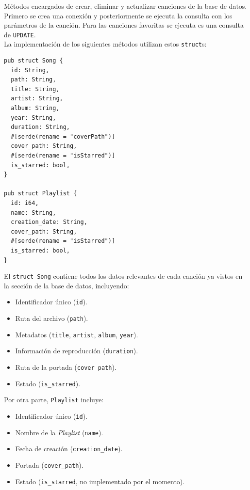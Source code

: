\documentclass[11pt, a4paper]{article}
\begin{document}
            Métodos encargados de crear, eliminar y actualizar canciones de la base de datos. Primero se crea una conexión y posteriormente se ejecuta la consulta con los parámetros de la canción. Para las canciones favoritas se ejecuta es una consulta de \texttt{UPDATE}. \\

            La implementación de los siguientes métodos utilizan estos \texttt{struct}s:

            \begin{lstlisting}[caption={structs Song y Playlist}]
pub struct Song {
  id: String,
  path: String,
  title: String,
  artist: String,
  album: String,
  year: String,
  duration: String,
  #[serde(rename = "coverPath")]
  cover_path: String,
  #[serde(rename = "isStarred")]
  is_starred: bool,
}

pub struct Playlist {
  id: i64,
  name: String,
  creation_date: String,
  cover_path: String,
  #[serde(rename = "isStarred")]
  is_starred: bool,
}
            \end{lstlisting}

            El \texttt{struct Song} contiene todos los datos relevantes de cada canción ya vistos en la sección de la base de datos, incluyendo:

            \begin{itemize}
              \item Identificador único (\texttt{id}).
              \item Ruta del archivo (\texttt{path}).
              \item Metadatos (\texttt{title}, \texttt{artist}, \texttt{album}, \texttt{year}).
              \item Información de reproducción (\texttt{duration}).
              \item Ruta de la portada (\texttt{cover\_path}).
              \item Estado (\texttt{is\_starred}).
            \end{itemize}

            Por otra parte, \texttt{Playlist} incluye:

            \begin{itemize}
              \item Identificador único (\texttt{id}).
              \item Nombre de la \textit{Playlist} (\texttt{name}).
              \item Fecha de creación (\texttt{creation\_date}).
              \item Portada (\texttt{cover\_path}).
              \item Estado (\texttt{is\_starred}, no implementado por el momento).
            \end{itemize}
\end{document}
